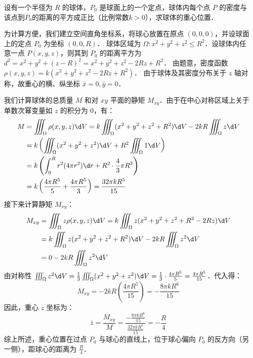 \documentclass[12pt, a4paper, oneside, UTF8]{ctexbook}
\begin{document}
\begin{exercise}
    设有一个半径为 $R$ 的球体，$P_0$ 是球面上的一个定点，球体内每个点 $P$ 的密度与该点到$P_0$的距离的平方成正比（比例常数$k>0$），求球体的重心位置．
\end{exercise}
\begin{solution}
为计算方便，我们建立空间直角坐标系，将球心放置在原点 $(0,0,0)$，并设球面上的定点 $P_0$ 为坐标 $(0,0,R)$．
球体区域为 $\Omega: x^2+y^2+z^2 \le R^2$．设球体内任意一点 $P(x,y,z)$，则其到 $P_0$ 的距离平方为 $d^2 = x^2+y^2+(z-R)^2 = x^2+y^2+z^2-2Rz+R^2$．
由题意，密度函数 $\rho(x,y,z) = k(x^2+y^2+z^2-2Rz+R^2)$．
由于球体及其密度分布关于 $z$ 轴对称，故重心的横、纵坐标 $\bar{x} = 0, \bar{y} = 0$．

我们计算球体的总质量 $M$ 和对 $xy$ 平面的静矩 $M_{xy}$．由于在中心对称区域上关于单数次幂变量如 $z$ 的积分为 0，有：
\begin{align*}
M &= \iiint_\Omega \rho(x,y,z) \d V = k \iiint_\Omega (x^2+y^2+z^2+R^2) \d V - 2kR \iiint_\Omega z \d V \\
  &= k \left( \iiint_\Omega (x^2+y^2+z^2) \d V + R^2 \iiint_\Omega 1 \d V \right) \\
  &= k \left( \int_0^R r^2 (4\pi r^2) \d r + R^2 \cdot \frac{4}{3}\pi R^3 \right) \\
  &= k \left( \frac{4\pi R^5}{5} + \frac{4\pi R^5}{3} \right) = \frac{32\pi k R^5}{15}
\end{align*}
接下来计算静矩 $M_{xy}$：
\begin{align*}
M_{xy} &= \iiint_\Omega z\rho(x,y,z) \d V = k \iiint_\Omega z(x^2+y^2+z^2+R^2-2Rz) \d V \\
       &= k \iiint_\Omega z(x^2+y^2+z^2+R^2) \d V - 2kR \iiint_\Omega z^2 \d V \\
       &= 0 - 2kR \iiint_\Omega z^2 \d V
\end{align*}
由对称性 $\iiint_\Omega z^2 \d V = \frac{1}{3} \iiint_\Omega (x^2+y^2+z^2) \d V = \frac{1}{3} \cdot \frac{4\pi R^5}{5} = \frac{4\pi R^5}{15}$．代入得：
\[ M_{xy} = -2kR \left( \frac{4\pi R^5}{15} \right) = -\frac{8\pi k R^6}{15} \]
因此，重心 $z$ 坐标为：
\[ \bar{z} = \frac{M_{xy}}{M} = \frac{-\frac{8\pi k R^6}{15}}{\frac{32\pi k R^5}{15}} = -\frac{R}{4} \]
综上所述，重心位置在过点 $P_0$ 与球心的直线上，位于球心偏向 $P_0$ 的反方向（另一侧），距球心的距离为 $\boxed{\frac{R}{4}}$．
\end{solution}
\end{document}
